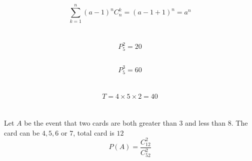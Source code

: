 \documentclass{article}
\begin{document}
        \subsection{}
                $$\sum _{k=1}^{n}(a-1)^nC_n ^k=(a-1+1)^n=a^n$$
    
    \section{}
        \subsection{}
                $$P_5 ^2 =20$$
        \subsection{}
                $$P_5 ^3=60$$
    
    \section{}
        $$T=4\times 5\times 2=40$$
    
    \section{}
        Let $A$ be the event that two cards are both greater than $3$ and less than $8$.
        The card can be $4,5,6$ or $7$, total card is $12$
        $$P(A)= \frac{C_{12} ^ 2}{C_{52} ^ 2}$$
\end{document}
